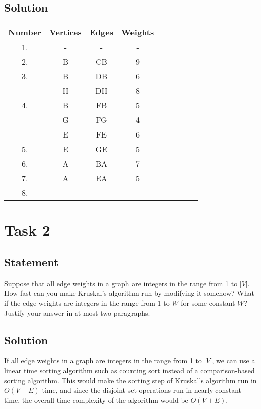 \documentclass[10pt]{article}
\begin{document}
\subsection{Solution}

\begin{center}
\begin{tabular}{|c|c|c|c|c|c|c|c|c|}
\hline
\textbf{Number} & \textbf{Vertices} & \textbf{Edges} & \textbf{Weights} \\
\hline
1. & - & - & - \\
\hline
2. & B & CB & 9 \\
\hline
3. & B & DB & 6 \\
\hline
& H & DH & 8 \\
\hline
4. & B & FB & 5 \\
\hline
& G & FG & 4 \\
\hline
& E & FE & 6 \\
\hline
5. & E & GE & 5 \\
\hline
6. & A & BA & 7 \\
\hline
7. & A & EA & 5 \\
\hline
8. & - & - & - \\
\hline
\end{tabular}
\end{center}

\section{Task 2}
\subsection{Statement}

Suppose that all edge weights in a graph are integers in the range from 1 to $|V|$. How fast can you make Kruskal's algorithm run by modifying it somehow? What if the edge weights are integers in the range from 1 to $W$ for some constant $W$? Justify your answer in at most two paragraphs.

\subsection{Solution}

If all edge weights in a graph are integers in the range from 1 to $|V|$, we can use a linear time sorting algorithm such as counting sort instead of a comparison-based sorting algorithm. This would make the sorting step of Kruskal's algorithm run in $O(V + E)$ time, and since the disjoint-set operations run in nearly constant time, the overall time complexity of the algorithm would be $O(V + E)$.
\end{document}
